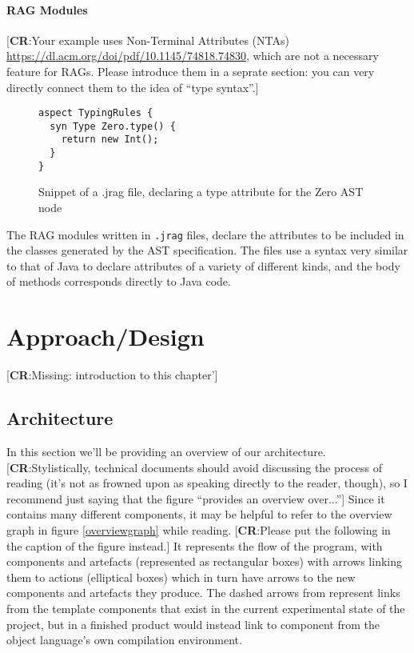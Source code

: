 \documentclass[nofilelist]{cslthse-msc}
\newcommand{\CR}[1]{\textcolor{green!60!black}{[\textbf{CR}:#1]}}
\begin{document}
\subsubsection{RAG Modules}
\CR{Your example uses Non-Terminal Attributes (NTAs) \url{https://dl.acm.org/doi/pdf/10.1145/74818.74830}, which are
not a necessary feature for RAGs.  Please introduce them in a seprate section: you can very directly connect them to the idea of ``type syntax''.}
\begin{figure}[h]
\begin{lstlisting}[language=jrag]
aspect TypingRules {
  syn Type Zero.type() {
    return new Int();
  }
}
\end{lstlisting}
  \caption{Snippet of a .jrag file, declaring a type attribute for the Zero AST node}
  \label{boolstrgen}
\end{figure}
The RAG modules written in \verb|.jrag| files, declare the attributes to be included in the classes generated by the AST specification.
The files use a syntax very similar to that of Java to declare attributes of a variety of different kinds, and the body of methods corresponds directly to Java code.

\chapter{Approach/Design} %

\CR{Missing: introduction to this chapter'}


\section{Architecture}
In this section we'll be providing an overview of our architecture.
\CR{Stylistically, technical documents should avoid discussing the process of reading (it's not as frowned upon as speaking directly to the reader, though), so I recommend just saying that the figure ``provides an overview over...''}
Since it contains many different components, it may be helpful to refer to the overview graph in figure \ref{overviewgraph} while reading.
\CR{Please put the following in the caption of the figure instead.}
It represents the flow of the program, with components and artefacts (represented as rectangular boxes) with arrows linking them to actions (elliptical boxes) which in turn have arrows to the new components and artefacts they produce.
The dashed arrows from represent links from the template components that exist in the current experimental state of the project, but in a finished product would instead link to component from the object language's own compilation environment.
\end{document}
